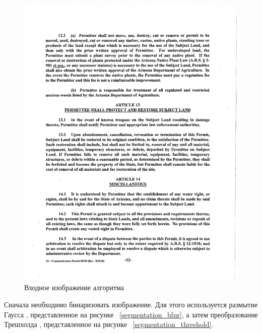 \begin{figure}
    \includegraphics[scale=0.5]{img/paragraph/input.png}
    \caption{Входное изображение алгоритма}
    \label{segmentation_input}
\end{figure}

Сначала необходимо бинаризовать изображение. Для этого используется размытие Гаусса \cite{gauss_blur}, представленное на рисунке ~\ref{segmentation_blur}, а затем преобразование Трешхолда \cite{opencv_threshold}, представленное на рисунке ~\ref{segmentation_threshold}.

